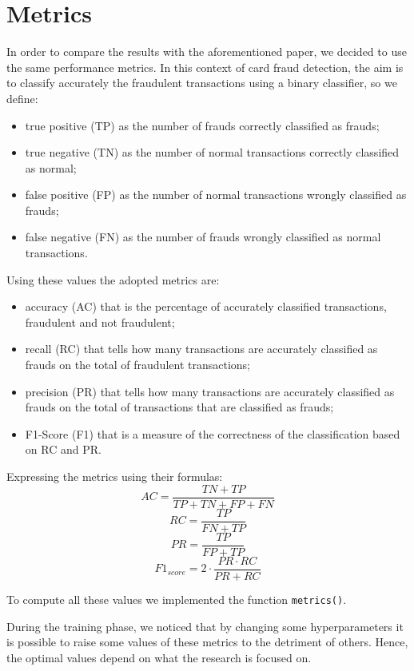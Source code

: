 \documentclass{Configuration_Files/PoliMi3i_thesis}
\begin{document}
\chapter{Metrics}
In order to compare the results with the aforementioned paper, we decided to use the same performance metrics. In this context of card fraud detection, the aim is to classify accurately the fraudulent transactions using a binary classifier, so we define:
\begin{itemize}
    \item true positive (TP) as the number of frauds correctly classified as frauds;
    \item true negative (TN) as the number of normal transactions correctly classified as normal;
    \item false positive (FP) as the number of normal transactions wrongly classified as frauds;
    \item false negative (FN) as the number of frauds wrongly classified as normal transactions.
\end{itemize}

Using these values the adopted metrics are:
\begin{itemize}
    \item accuracy (AC) that is the percentage of accurately classified transactions, fraudulent and not fraudulent;
    \item recall (RC) that tells how many transactions are accurately classified as frauds on the total of fraudulent transactions;
    \item precision (PR) that tells how many transactions are accurately classified as frauds on the total of transactions that are classified as frauds;
    \item F1-Score (F1) that is a measure of the correctness of the classification based on RC and PR.
\end{itemize}

Expressing the metrics using their formulas:
$$AC = \frac{TN + TP}{TP + TN + FP + FN}$$
$$RC = \frac{TP}{FN + TP}$$
$$PR = \frac{TP}{FP + TP}$$
$$F1_{score} = 2 \cdot \frac{PR \cdot RC}{PR + RC}$$

To compute all these values we implemented the function \verb|metrics()|.

During the training phase, we noticed that by changing some hyperparameters it is possible to raise some values of these metrics to the detriment of others. Hence, the optimal values depend on what the research is focused on. 
\end{document}
